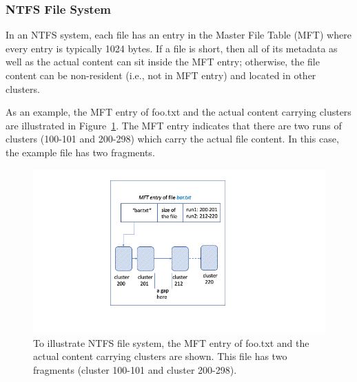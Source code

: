 \subsubsection{NTFS File System} \label{subsubsec:ntfs-overview}
\begin{paraphrase}

In an NTFS system, each file has an entry in the Master File Table (MFT) where every entry is typically 1024 bytes. 
If a file is short, then all of its metadata as well as the actual content can sit inside the MFT entry; otherwise, 
the file content can be non-resident (i.e., not in MFT entry) and located in other clusters.
  
As an example, the MFT entry of foo.txt and the actual content carrying clusters are illustrated in Figure~\ref{fig:ntfs}.
The MFT entry indicates that there are two runs of clusters (100-101 and 200-298) which carry the actual file content. 
In this case, the example file has two fragments.

 \begin{figure}[h]
     \centering
     \includegraphics[width=\linewidth]{fig/ntfs.png}
     \caption{To illustrate NTFS file system, the MFT entry of foo.txt and the actual content carrying clusters are shown. 
 This file has two fragments (cluster 100-101 and cluster 200-298).}
     \label{fig:ntfs}
 \end{figure}
 
\end{paraphrase}

